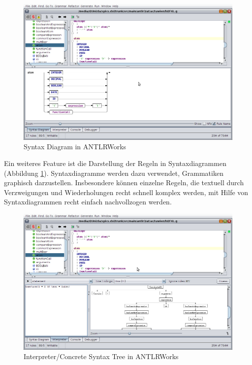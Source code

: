 \begin{figure}[h]
\includegraphics[scale=0.35]{figures/antlrworks_syntax_diagram}
\caption{Syntax Diagram in ANTLRWorks}
\label{abb_antlrworks_syntax_diagram}
\end{figure}

Ein weiteres Feature ist die Darstellung der Regeln in Syntaxdiagrammen (Abbildung \ref{abb_antlrworks_syntax_diagram}). Syntaxdiagramme werden dazu verwendet, Grammatiken graphisch darzustellen. Insbesondere können einzelne Regeln, die textuell durch Verzweigungen und Wiederholungen recht schnell komplex werden, mit Hilfe von Syntaxdiagrammen recht einfach nachvollzogen werden.

\begin{figure}[h]
\includegraphics[scale=0.35]{figures/antlrworks_interpreter}
\caption{Interpreter/Concrete Syntax Tree in ANTLRWorks}
\label{abb_antlrworks_interpreter}
\end{figure}

